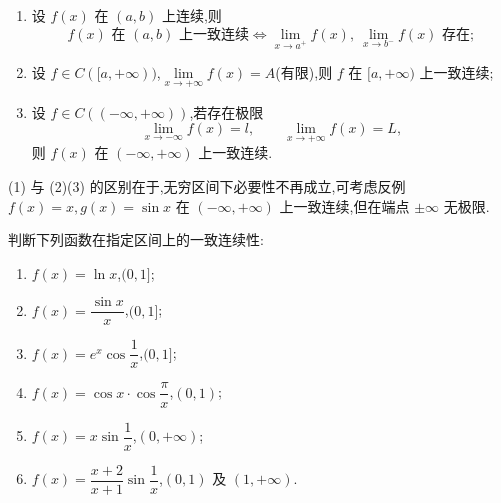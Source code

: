 \begin{theorem}[\markstar]
    \leavevmode
    \begin{enumerate}
        \item 设 $f(x)$ 在 $(a,b)$ 上连续,则
              \[
                  f(x)\text{ 在 }(a,b)\text{ 上一致连续}
                  \Longleftrightarrow
                  \lim\limits_{x\to a^+}f(x),\ \lim\limits_{x\to b^-}f(x)\text{ 存在};
              \]
        \item 设 $f\in C(\lbrack a,+\infty))$,$\displaystyle\lim\limits_{x\to+\infty}f(x)=A$(有限),则 $f$ 在 $\lbrack a,+\infty)$ 上一致连续;
        \item 设 $f\in C(( -\infty,+\infty))$,若存在极限
              \[
                  \displaystyle\lim\limits_{x\to-\infty}f(x)=l, \qquad \lim\limits_{x\to+\infty}f(x)=L,
              \]
              则 $f(x)$ 在 $(-\infty,+\infty)$ 上一致连续.
    \end{enumerate}
\end{theorem}

\begin{remark}

    (1) 与 (2)(3) 的区别在于,无穷区间下必要性不再成立,可考虑反例 $f(x)=x,g(x)=\sin x$ 在 $(-\infty,+\infty)$ 上一致连续,但在端点 $\pm\infty$ 无极限.
\end{remark}

\begin{example}
    判断下列函数在指定区间上的一致连续性:
    \begin{enumerate}
        \item $f(x)=\ln x$,$(0,1\rbrack$;
        \item $f(x)=\dfrac{\sin x}{x}$,$(0,1\rbrack$;
        \item $f(x)=e^x\cos\dfrac{1}{x}$,$(0,1\rbrack$;
        \item $f(x)=\cos x\cdot\cos\dfrac{\pi}{x}$,$(0,1)$;
        \item $f(x)=x\sin\dfrac{1}{x}$,$(0,+\infty)$;
        \item $f(x)=\dfrac{x+2}{x+1}\sin\dfrac{1}{x}$,$(0,1)$ 及 $(1,+\infty)$.
    \end{enumerate}
\end{example}
\exampleblank

